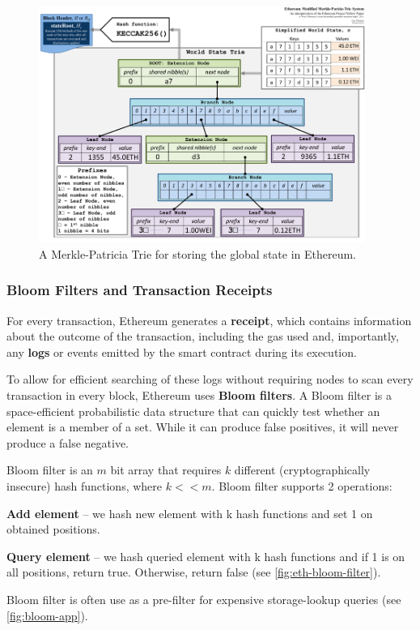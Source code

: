 \begin{figure}[t]
	\begin{center}
		\includegraphics[width=0.95\textwidth]{./figs/eth-mpt.png}
		\caption{A Merkle-Patricia Trie for storing the global state in Ethereum.}		
		\label{fig:eth-mpt}
	\end{center}	
\end{figure}



\subsubsection{Bloom Filters and Transaction
	Receipts}\label{bloom-filters-and-transaction-receipts}

For every transaction, Ethereum generates a \textbf{receipt}, which
contains information about the outcome of the transaction, including the
gas used and, importantly, any \textbf{logs} or events emitted by the
smart contract during its execution.

To allow for efficient searching of these logs without requiring nodes
to scan every transaction in every block, Ethereum uses \textbf{Bloom
	filters}. A Bloom filter is a space-efficient probabilistic data
structure that can quickly test whether an element is a member of a set.
While it can produce false positives, it will never produce a false
negative.

Bloom filter is an $m$ bit array that requires $k$ different (cryptographically insecure) hash functions, where $k << m$. 
Bloom filter supports 2 operations:
\begin{compactenum}
	\item \textbf{Add element} -- we hash new element with k hash functions and set 1 on obtained positions.
	\item \textbf{Query element} -- we hash queried element with k hash functions and if 1 is on all positions, return true. Otherwise, return false (see \autoref{fig:eth-bloom-filter}).
\end{compactenum}
Bloom filter is often use as a pre-filter for expensive storage-lookup queries (see \autoref{fig:bloom-app}).

